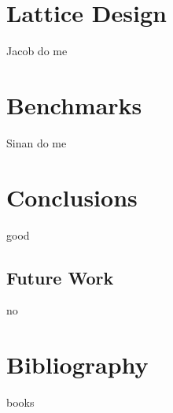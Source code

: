 \documentclass[11pt]{article}
\begin{document}
\section{Lattice Design}

Jacob do me

\section{Benchmarks}

Sinan do me

\section{Conclusions}

good

\subsection{Future Work}

no

\section{Bibliography}

books
\end{document}
